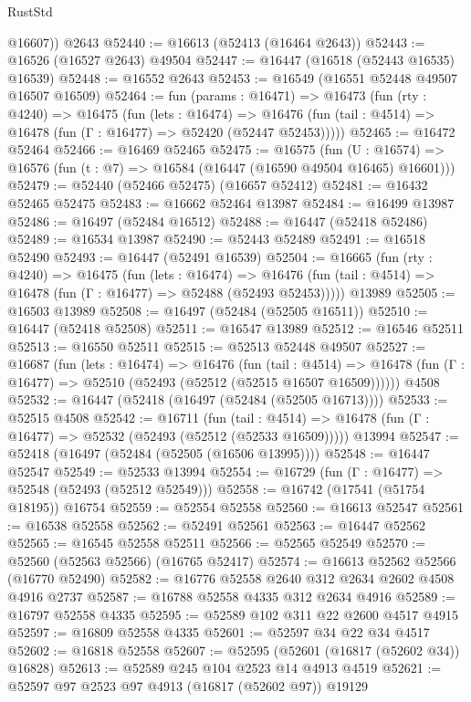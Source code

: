 \begin{lexlean}{RustStd}
\begin{coremodule}
{\begin{coremodule}
{{{{{{{{{{{{{{{{{{{{{{{{{{{{{{{{{{{{{{{{{{{{{{{{{{{{{{{        @16607))
    @2643
@52440 := @16613 (@52413 (@16464 @2643))
@52443 := @16526 (@16527 @2643) @49504
@52447 := @16447 (@16518 (@52443 @16535) @16539)
@52448 := @16552 @2643
@52453 := @16549 (@16551 @52448 @49507 @16507 @16509)
@52464 := fun (params : @16471) =>
  @16473
    (fun (rty : @4240) =>
    @16475
      (fun (lets : @16474) =>
      @16476 (fun (tail : @4514) => @16478 (fun (Γ : @16477) => @52420 (@52447 @52453)))))
@52465 := @16472 @52464
@52466 := @16469 @52465
@52475 := @16575
    (fun (U : @16574) => @16576 (fun (t : @7) => @16584 (@16447 (@16590 @49504 @16465) @16601)))
@52479 := @52440 (@52466 @52475) (@16657 @52412)
@52481 := @16432 @52465 @52475
@52483 := @16662 @52464 @13987
@52484 := @16499 @13987
@52486 := @16497 (@52484 @16512)
@52488 := @16447 (@52418 @52486)
@52489 := @16534 @13987
@52490 := @52443 @52489
@52491 := @16518 @52490
@52493 := @16447 (@52491 @16539)
@52504 := @16665
    (fun (rty : @4240) =>
    @16475
      (fun (lets : @16474) =>
      @16476 (fun (tail : @4514) => @16478 (fun (Γ : @16477) => @52488 (@52493 @52453)))))
    @13989
@52505 := @16503 @13989
@52508 := @16497 (@52484 (@52505 @16511))
@52510 := @16447 (@52418 @52508)
@52511 := @16547 @13989
@52512 := @16546 @52511
@52513 := @16550 @52511
@52515 := @52513 @52448 @49507
@52527 := @16687
    (fun (lets : @16474) =>
    @16476
      (fun (tail : @4514) =>
      @16478 (fun (Γ : @16477) => @52510 (@52493 (@52512 (@52515 @16507 @16509))))))
    @4508
@52532 := @16447 (@52418 (@16497 (@52484 (@52505 @16713))))
@52533 := @52515 @4508
@52542 := @16711
    (fun (tail : @4514) => @16478 (fun (Γ : @16477) => @52532 (@52493 (@52512 (@52533 @16509)))))
    @13994
@52547 := @52418 (@16497 (@52484 (@52505 (@16506 @13995))))
@52548 := @16447 @52547
@52549 := @52533 @13994
@52554 := @16729 (fun (Γ : @16477) => @52548 (@52493 (@52512 @52549)))
@52558 := @16742 (@17541 (@51754 @18195)) @16754
@52559 := @52554 @52558
@52560 := @16613 @52547
@52561 := @16538 @52558
@52562 := @52491 @52561
@52563 := @16447 @52562
@52565 := @16545 @52558 @52511
@52566 := @52565 @52549
@52570 := @52560 (@52563 @52566) (@16765 @52417)
@52574 := @16613 @52562 @52566 (@16770 @52490)
@52582 := @16776 @52558 @2640 @312 @2634 @2602 @4508 @4916 @2737
@52587 := @16788 @52558 @4335 @312 @2634 @4916
@52589 := @16797 @52558 @4335
@52595 := @52589 @102 @311 @22 @2600 @4517 @4915
@52597 := @16809 @52558 @4335
@52601 := @52597 @34 @22 @34 @4517
@52602 := @16818 @52558
@52607 := @52595 (@52601 (@16817 (@52602 @34)) @16828)
@52613 := @52589 @245 @104 @2523 @14 @4913 @4519
@52621 := @52597 @97 @2523 @97 @4913 (@16817 (@52602 @97)) @19129
}}}}}}}}}}}}}}}}}}}}}}}}}}}}}}}}}}}}}}}}}}}}}}}}}}}}}}}
\end{coremodule}}
\end{coremodule}
\end{lexlean}
